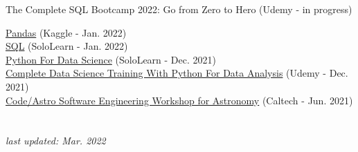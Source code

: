 \documentclass[letterpaper,11pt]{article}
\begin{document}
The Complete SQL Bootcamp 2022: Go from Zero to Hero (Udemy - in progress)

\href{https://awesomecosmos.github.io/files/2022_01_kaggle.pdf}{Pandas} (Kaggle - Jan. 2022) \\

\href{https://awesomecosmos.github.io/files/2022_01_sololearn.pdf}{SQL} (SoloLearn - Jan. 2022) \\

\href{https://awesomecosmos.github.io/files/2021_12_sololearn.pdf}{Python For Data Science} (SoloLearn - Dec. 2021) \\

\href{https://awesomecosmos.github.io/files/2021_12_udemy.pdf}{Complete Data Science Training With Python For Data Analysis} (Udemy - Dec. 2021) \\

\href{https://awesomecosmos.github.io/files/2021_06_codeastro.pdf}{Code/Astro Software Engineering Workshop for Astronomy} (Caltech - Jun. 2021)


\section{}
\centering \textit{last updated: Mar. 2022}
\end{document}
